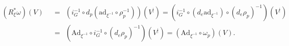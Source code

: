 \documentclass[a4paper,11pt]{article}
\newcommand{\ad}{\textrm{ad}}
\newcommand{\Ad}{\textrm{Ad}}
\begin{document}
\begin{displaymath}
\begin{split}
(R^{*}_{\xi}\omega)(V) \,\; &= \,\; (i^{-1}_{G}\circ d_{p}(\ad_{\xi^{-1}}\circ\rho_{p}^{-1}))(V^{|}) = (i^{-1}_{G}\circ(d_{e}\ad_{\xi^{-1}})\circ(d_{e}\rho_{p})^{-1})(V^{|}) \\
\,\; &= \,\; (\Ad_{\xi^{-1}}\circ i^{-1}_{G}\circ(d_{e}\rho_{p})^{-1})(V^{|})=(\Ad_{\xi^{-1}}\circ\omega_{p})(V)\textrm{.}
\end{split}
\end{displaymath}
\end{document}
